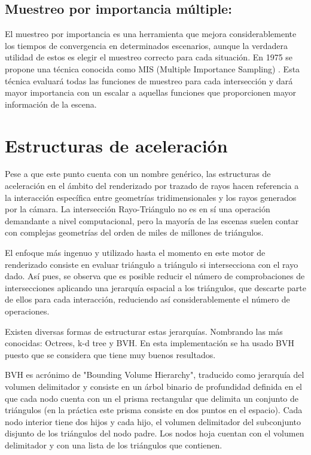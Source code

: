 \subsection{Muestreo por importancia múltiple:}

El muestreo por importancia es una herramienta que mejora considerablemente los tiempos de convergencia en determinados escenarios, aunque la verdadera utilidad de estos es elegir el muestreo correcto para cada situación. En 1975 se propone una técnica conocida como MIS (Multiple Importance Sampling) \cite{veach1995optimally}. Esta técnica evaluará todas las funciones de  muestreo para cada intersección y dará mayor importancia con un escalar a aquellas funciones que proporcionen mayor información de la escena.



\section{Estructuras de aceleración}
\label{BVH}
	
Pese a que este punto cuenta con un nombre genérico, las estructuras de aceleración en el ámbito del renderizado por trazado de rayos hacen referencia a la interacción específica entre geometrías tridimensionales y los rayos generados por la cámara. La intersección Rayo-Triángulo no es en sí una operación demandante a nivel computacional, pero la mayoría de las escenas suelen contar con complejas geometrías del orden de miles de millones de triángulos.

El enfoque más ingenuo y utilizado hasta el momento en este motor de renderizado consiste en evaluar triángulo a triángulo si intersecciona con el rayo dado. Así pues, se observa que es posible reducir el número de comprobaciones de intersecciones aplicando una jerarquía espacial a los triángulos, que descarte parte de ellos para cada interacción, reduciendo así considerablemente el número de operaciones.

Existen diversas formas de estructurar estas jerarquías. Nombrando las más conocidas: Octrees, k-d tree y BVH. En esta implementación se ha usado BVH puesto que se considera que tiene muy buenos resultados.

BVH es acrónimo de "Bounding Volume Hierarchy", traducido como jerarquía del volumen delimitador y consiste en un árbol binario de profundidad definida en el que cada nodo cuenta con un el prisma rectangular que delimita un conjunto de triángulos (en la práctica este prisma consiste en dos puntos en el espacio). Cada nodo interior tiene dos hijos y cada hijo, el volumen delimitador del subconjunto disjunto de los triángulos del nodo padre. Los nodos hoja cuentan con el volumen delimitador y con una lista de los triángulos que contienen.

